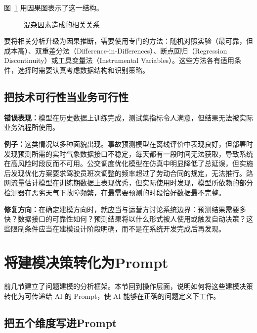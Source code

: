 图~\ref{fig:ch03_confounder} 用因果图表示了这一结构。

\begin{figure}[H]
  \centering
  \caption{混杂因素造成的相关关系}
  \label{fig:ch03_confounder}
\end{figure}

要将相关分析升级为因果推断，需要使用专门的方法：随机对照实验（最可靠，但成本高）、双重差分法（Difference-in-Differences）、断点回归（Regression Discontinuity）或工具变量法（Instrumental Variables）。这些方法各有适用条件，选择时需要认真考虑数据结构和识别策略。

\subsection{把技术可行性当业务可行性}

\textbf{错误表现：}模型在历史数据上训练完成，测试集指标令人满意，但结果无法被实际业务流程所使用。

\textbf{例子：}这类情况以多种面貌出现。事故预测模型在离线评价中表现良好，但部署时发现预测所需的实时气象数据接口不稳定，每天都有一段时间无法获取，导致系统在高风险时段反而不可用。公交调度优化模型在仿真中明显降低了总延误，但实施后发现优化方案要求驾驶员班次调整的频率超过了劳动合同的规定，无法推行。路网流量估计模型在训练期数据上表现优秀，但实际使用时发现，模型所依赖的部分检测器在恶劣天气下故障频繁，在最需要预测的时段恰好数据最不完整。

\textbf{修复方向：}在确定建模方向时，就应当与运营方讨论系统边界：预测结果需要多快？数据接口的可靠性如何？预测结果将以什么形式被人使用或触发自动决策？这些限制条件应当在建模设计阶段明确，而不是在系统开发完成后再发现。

\section{将建模决策转化为Prompt}

前几节建立了问题建模的分析框架。本节回到操作层面，说明如何将这些建模决策转化为可传递给 AI 的 Prompt，使 AI 能够在正确的问题定义下工作。

\subsection{把五个维度写进Prompt}

